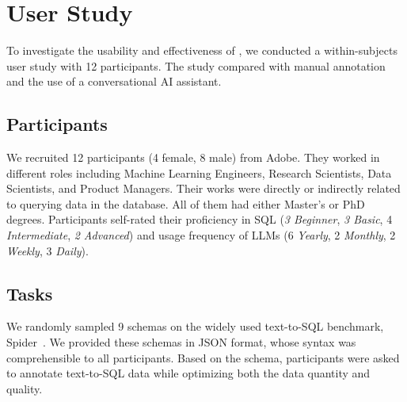 \section{User Study}
To investigate the usability and effectiveness of {\tool}, we conducted a within-subjects user study with 12 participants. The study compared {\tool} with manual annotation and the use of a conversational AI assistant. 



\subsection{Participants}
We recruited 12 participants (4 female, 8 male) from Adobe. They worked in different roles including Machine Learning Engineers, Research Scientists, Data Scientists, and Product Managers.
Their works were directly or indirectly related to querying data in the database.
All of them had either Master's or PhD degrees.
Participants self-rated their proficiency in SQL (\textit{3 Beginner}, \textit{3 Basic}, 4 \textit{Intermediate}, \textit{2 Advanced}) and usage frequency of LLMs (6 \textit{Yearly}, 2 \textit{Monthly}, 2 \textit{Weekly}, 3 \textit{Daily}).

\subsection{Tasks}

We randomly sampled 9 schemas on the widely used text-to-SQL benchmark, Spider~\cite{spider}. 
We provided these schemas in JSON format, whose syntax was comprehensible to all participants.
Based on the schema, participants were asked to annotate text-to-SQL data while optimizing both the data quantity and quality.




